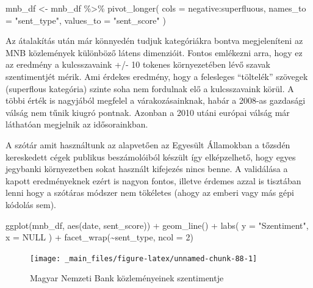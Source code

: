 \documentclass[
]{book}
\newenvironment{Shaded}{\begin{snugshade}}{\end{snugshade}}
\newcommand{\AttributeTok}[1]{\textcolor[rgb]{0.77,0.63,0.00}{#1}}
\newcommand{\ConstantTok}[1]{\textcolor[rgb]{0.00,0.00,0.00}{#1}}
\newcommand{\DecValTok}[1]{\textcolor[rgb]{0.00,0.00,0.81}{#1}}
\newcommand{\FunctionTok}[1]{\textcolor[rgb]{0.00,0.00,0.00}{#1}}
\newcommand{\NormalTok}[1]{#1}
\newcommand{\OtherTok}[1]{\textcolor[rgb]{0.56,0.35,0.01}{#1}}
\newcommand{\SpecialCharTok}[1]{\textcolor[rgb]{0.00,0.00,0.00}{#1}}
\newcommand{\StringTok}[1]{\textcolor[rgb]{0.31,0.60,0.02}{#1}}
\begin{document}
\begin{Shaded}
\begin{Highlighting}[]
\NormalTok{mnb\_df }\OtherTok{\textless{}{-}}\NormalTok{ mnb\_df }\SpecialCharTok{\%\textgreater{}\%}
  \FunctionTok{pivot\_longer}\NormalTok{(}
    \AttributeTok{cols =}\NormalTok{ negative}\SpecialCharTok{:}\NormalTok{superfluous,}
    \AttributeTok{names\_to =} \StringTok{"sent\_type"}\NormalTok{,}
    \AttributeTok{values\_to =} \StringTok{"sent\_score"}
\NormalTok{  )}
\end{Highlighting}
\end{Shaded}

Az átalakítás után már könnyedén tudjuk kategóriákra bontva
megjeleníteni az MNB közlemények különböző látens dimenzióit. Fontos
emlékezni arra, hogy ez az eredmény a kulcsszavaink +/- 10 tokenes
környezetében lévő szavak szentimentjét mérik. Ami érdekes eredmény,
hogy a felesleges ``töltelék'' szövegek (superflous kategória) szinte
soha nem fordulnak elő a kulcsszavaink körül. A többi érték is nagyjából
megfelel a várakozásainknak, habár a 2008-as gazdasági válság nem tűnik
kiugró pontnak. Azonban a 2010 utáni európai válság már láthatóan
megjelnik az idősorainkban.

A szótár amit használtunk az alapvetően az Egyesült Államokban a tőzsdén
kereskedett cégek publikus beszámolóiból készült így elképzelhető, hogy
egyes jegybanki környezetben sokat használt kifejezés nincs benne. A
validálása a kapott eredményeknek ezért is nagyon fontos, illetve
érdemes azzal is tisztában lenni hogy a szótáras módszer nem tökéletes
(ahogy az emberi vagy más gépi kódolás sem).

\begin{Shaded}
\begin{Highlighting}[]
\FunctionTok{ggplot}\NormalTok{(mnb\_df, }\FunctionTok{aes}\NormalTok{(date, sent\_score)) }\SpecialCharTok{+}
  \FunctionTok{geom\_line}\NormalTok{() }\SpecialCharTok{+}
  \FunctionTok{labs}\NormalTok{(}
    \AttributeTok{y =} \StringTok{"Szentiment"}\NormalTok{,}
    \AttributeTok{x =} \ConstantTok{NULL}
\NormalTok{  ) }\SpecialCharTok{+}
  \FunctionTok{facet\_wrap}\NormalTok{(}\SpecialCharTok{\textasciitilde{}}\NormalTok{sent\_type, }\AttributeTok{ncol =} \DecValTok{2}\NormalTok{)}
\end{Highlighting}
\end{Shaded}

\begin{figure}

{\centering \texttt{[image: \_main\_files/figure-latex/unnamed-chunk-88-1]} 

}

\caption{Magyar Nemzeti Bank közleményeinek szentimentje}\label{fig:unnamed-chunk-88}
\end{figure}
\end{document}
